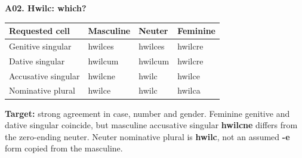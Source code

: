 \par\begin{minipage}{\linewidth}\raggedright
\textbf{A02. Hwilc: which?}

\par\begingroup
\fontsize{10.5}{13.2}\selectfont
\setlength{\LTleft}{0pt}\setlength{\LTright}{\fill}
\noindent
\begin{tabular}{@{}>{\raggedright\arraybackslash}p{36.86mm}>{\raggedright\arraybackslash}p{26.23mm}>{\raggedright\arraybackslash}p{26.23mm}>{\raggedright\arraybackslash}p{26.23mm}@{}}
\toprule
\textbf{Requested cell} & \textbf{Masculine} & \textbf{Neuter} & \textbf{Feminine} \\
\midrule
Genitive singular & hwilces & hwilces & hwilcre \\
Dative singular & hwilcum & hwilcum & hwilcre \\
Accusative singular & hwilcne & hwilc & hwilce \\
Nominative plural & hwilce & hwilc & hwilca \\
\bottomrule
\end{tabular}
\par\endgroup

\textbf{Target:} strong agreement in case, number and gender. Feminine genitive and dative singular coincide, but masculine accusative singular \textbf{hwilcne} differs from the zero-ending neuter. Neuter nominative plural is \textbf{hwilc}, not an assumed \textbf{-e} form copied from the masculine.

\end{minipage}\par\addvspace{4pt}

